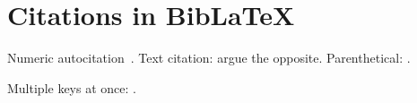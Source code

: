 \documentclass[12pt]{article}
\begin{document}
\section{Citations in BibLaTeX}

Numeric autocitation~\autocite{smith2025}.
Text citation: \textcite{doe2024} argue the opposite.
Parenthetical: \parencite{wang2026}.

Multiple keys at once: \autocite{smith2025,doe2024,wang2026}.

\printbibliography
\end{document}
